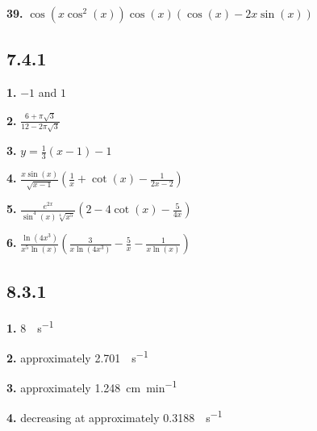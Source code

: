 \documentclass[12pt,]{book}
\theoremstyle{plain}
\theoremstyle{definition}
\numberwithin{equation}{section}
\newcommand{\fe}[2]{#1\mathopen{}\left(#2\right)\mathclose{}}
\begin{document}
                \par\smallskip
\noindent\textbf{39.}\quad{}
                    \(\fe{\cos}{x\fe{\cos^2}{x}}\fe{\cos}{x}\left(\fe{\cos}{x}-2x\fe{\sin}{x}\right)\)%

                \par\smallskip
\subsection*{7.4.1 }
\noindent\textbf{1.}\quad{}
                \(-1\) and \(1\)%

            \par\smallskip
\noindent\textbf{2.}\quad{}
                \(\frac{6+\pi\sqrt{3}}{12-2\pi\sqrt{3}}\)%

            \par\smallskip
\noindent\textbf{3.}\quad{}
               \(y=\frac{1}{3}(x-1)-1\)%

            \par\smallskip
\noindent\textbf{4.}\quad{}
                    \(\frac{x\fe{\sin}{x}}{\sqrt{x-1}}\left(\frac{1}{x}+\fe{\cot}{x}-\frac{1}{2x-2}\right)\)%

                \par\smallskip
\noindent\textbf{5.}\quad{}
                    \(\frac{e^{2x}}{\fe{\sin^4}{x}\sqrt[4]{x^5}}\left(2-4\fe{\cot}{x}-\frac{5}{4x}\right)\)%

                \par\smallskip
\noindent\textbf{6.}\quad{}
                    \(\frac{\fe{\ln}{4x^3}}{x^5\fe{\ln}{x}}\left(\frac{3}{x\fe{\ln}{4x^3}}-\frac{5}{x}-\frac{1}{x\fe{\ln}{x}}\right)\)%

                \par\smallskip
\subsection*{8.3.1 }
\noindent\textbf{1.}\quad{}
                \SI{8}{\foot\per\second}%

            \par\smallskip
\noindent\textbf{2.}\quad{}
                approximately \SI{2.701}{\foot\per\second}%

            \par\smallskip
\noindent\textbf{3.}\quad{}
                approximately \SI{1.248}{\centi\meter\per\minute}%

            \par\smallskip
\noindent\textbf{4.}\quad{}
                decreasing at approximately \SI{0.3188}{\foot\per\second}%
\end{document}
